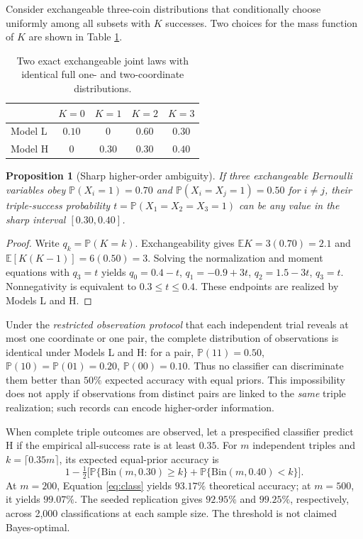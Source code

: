 \documentclass[11pt,a4paper]{article}
\newtheorem{proposition}{Proposition}
\newcommand{\PP}{\mathbb{P}}
\newcommand{\EE}{\mathbb{E}}
\begin{document}
Consider exchangeable three-coin distributions that conditionally choose uniformly among all subsets with $K$ successes. Two choices for the mass function of $K$ are shown in Table \ref{tab:moment}.

\begin{table}[H]
\centering\small
\caption{Two exact exchangeable joint laws with identical full one- and two-coordinate distributions.}\label{tab:moment}
\begin{tabular}{@{}lcccc@{}}\toprule
 & $K=0$ & $K=1$ & $K=2$ & $K=3$ \\\midrule
Model L & $0.10$ & $0$ & $0.60$ & $0.30$ \\
Model H & $0$ & $0.30$ & $0.30$ & $0.40$ \\\bottomrule\end{tabular}
\end{table}

\begin{proposition}[Sharp higher-order ambiguity]\label{prop:ident}
If three exchangeable Bernoulli variables obey $\PP(X_i=1)=0.70$ and $\PP(X_i=X_j=1)=0.50$ for $i\ne j$, their triple-success probability $t=\PP(X_1=X_2=X_3=1)$ can be any value in the sharp interval $[0.30,0.40]$.
\end{proposition}
\begin{proof}
Write $q_k=\PP(K=k)$. Exchangeability gives $\EE K=3(0.70)=2.1$ and $\EE[K(K-1)]=6(0.50)=3$. Solving the normalization and moment equations with $q_3=t$ yields $q_0=0.4-t$, $q_1=-0.9+3t$, $q_2=1.5-3t$, $q_3=t$. Nonnegativity is equivalent to $0.3\le t\le0.4$. These endpoints are realized by Models L and H.
\end{proof}

Under the \emph{restricted observation protocol} that each independent trial reveals at most one coordinate or one pair, the complete distribution of observations is identical under Models L and H: for a pair, $\PP(11)=0.50$, $\PP(10)=\PP(01)=0.20$, $\PP(00)=0.10$. Thus no classifier can discriminate them better than $50\%$ expected accuracy with equal priors. This impossibility does not apply if observations from distinct pairs are linked to the \emph{same} triple realization; such records can encode higher-order information.

When complete triple outcomes are observed, let a prespecified classifier predict H if the empirical all-success rate is at least $0.35$. For $m$ independent triples and $k=\lceil0.35m\rceil$, its expected equal-prior accuracy is
\begin{equation}\label{eq:class}
1-\tfrac12\Big[\PP\{\mathrm{Bin}(m,0.30)\ge k\}+\PP\{\mathrm{Bin}(m,0.40)< k\}\Big].
\end{equation}
At $m=200$, Equation \eqref{eq:class} yields $93.17\%$ theoretical accuracy; at $m=500$, it yields $99.07\%$. The seeded replication gives $92.95\%$ and $99.25\%$, respectively, across 2,000 classifications at each sample size. The threshold is not claimed Bayes-optimal.
\end{document}

